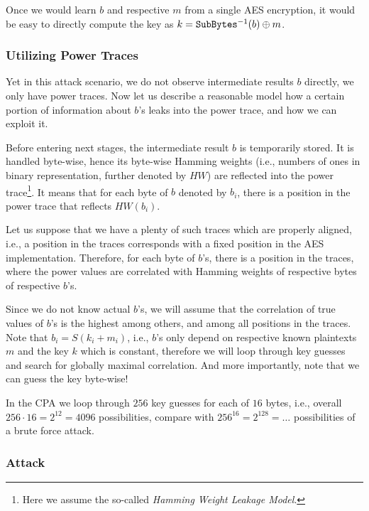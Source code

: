 	Once we would learn $b$ and respective $m$ from a single AES encryption, it would be easy to directly compute the key as $k = {\texttt{SubBytes}}^{-1}(b)\oplus m$.

\subsubsection{Utilizing Power Traces}
	
	Yet in this attack scenario, we do not observe intermediate results $b$ directly, we only have power traces. Now let us describe a reasonable model how a certain portion of information about $b$'s leaks into the power trace, and how we can exploit it.
	
	Before entering next stages, the intermediate result $b$ is temporarily stored. It is handled byte-wise, hence its byte-wise Hamming weights (i.e., numbers of ones in binary representation, further denoted by $HW$) are reflected into the power trace\footnote{Here we assume the so-called {\em Hamming Weight Leakage Model}.}. It means that for each byte of $b$ denoted by $b_i$, there is a position in the power trace that reflects $HW(b_i)$.
	
	Let us suppose that we have a plenty of such traces which are properly aligned, i.e., a position in the traces corresponds with a fixed position in the AES implementation. Therefore, for each byte of $b$'s, there is a position in the traces, where the power values are correlated with Hamming weights of respective bytes of respective $b$'s.
	
	Since we do not know actual $b$'s, we will assume that the correlation of true values of $b$'s is the highest among others, and among all positions in the traces. Note that $b_i = S(k_i+m_i)$, i.e., $b$'s only depend on respective known plaintexts $m$ and the key $k$ which is constant, therefore we will loop through key guesses and search for globally maximal correlation. And more importantly, note that we can guess the key byte-wise!
	
	\begin{note}
	\label{note:brutevssca}
		In the CPA we loop through $256$ key guesses for each of $16$ bytes, i.e., overall $256\cdot 16 = 2^{12} = 4096$ possibilities, compare with $256^{16} = 2^{128} = \ldots$ possibilities of a brute force attack.   %
	\end{note}

\subsubsection{Attack}
	
